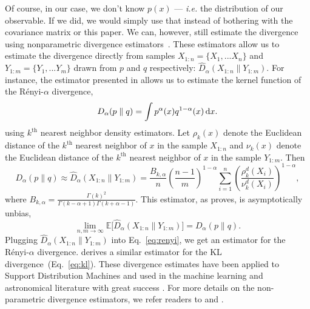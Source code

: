 \documentclass[12pt, letterpaper, preprint]{aastex}
\newcommand{\beq}{\begin{equation}}
\newcommand{\eeq}{\end{equation}}
\begin{document}
Of course, in our case, we don't know $p(x)$ --- \emph{i.e.} the distribution of
our observable. If we did, we would simply use that instead of bothering with 
the covariance matrix or this paper. We can, however, still estimate the 
divergence using nonparametric divergence estimators~\citep{wang2009, poczos2012, krishnamurthy2014}. 
These estimators allow us to estimate the divergence directly from 
samples $X_{1:n} = \{ X_1, ... X_n \}$ and $Y_{1:m} = \{ Y_1, ... Y_m \}$ 
drawn from $p$ and $q$ respectively: $\hat{D}_{\alpha}(X_{1:n} \parallel Y_{1:m})$. 
For instance, the estimator presented in \cite{poczos2012} allows us to estimate 
the kernel function of the R\'enyi-$\alpha$ divergence,
\beq \label{eq:d_alpha}
D_{\alpha} ( p \parallel q ) = \int p^\alpha(x) q^{1-\alpha}(x)\,{\rm d}x. 
\eeq
using $k^\mathrm{th}$ nearest neighbor density estimators. Let $\rho_k(x)$ 
denote the Euclidean distance of the $k^\mathrm{th}$ nearest neighbor 
of $x$ in the sample $X_{1:n}$ and $\nu_k(x)$ denote the Euclidean distance 
of the $k^\mathrm{th}$ nearest neighbor of $x$ in the sample $Y_{1:m}$. Then 
\beq \label{eq:d_alpha_est}
D_{\alpha}(p \parallel q) \approx \hat{D}_{\alpha}(X_{1:n} \parallel Y_{1:m}) = \frac{B_{k,\alpha}}{n} \left(\frac{n-1}{m}\right)^{1-\alpha}
\sum\limits_{i=1}^{n} \left(\frac{\rho_k^{d}(X_i)}{\nu_k^{d}(X_i)} \right)^{1-\alpha},
\eeq
where $B_{k, \alpha} = \frac{\Gamma(k)^2}{\Gamma(k-\alpha+1)\Gamma(k+\alpha-1)}$. 
This estimator, as \cite{poczos2012} proves, is asymptotically unbias,
\beq
\lim_{n, m \rightarrow \infty} \mathbb{E} \big[ \hat{D}_{\alpha} (X_{1:n} \parallel Y_{1:m}) \big] = D_{\alpha} (p \parallel q).
\eeq
Plugging $\hat{D}_{\alpha}(X_{1:n} \parallel Y_{1:m})$ into Eq.~\ref{eq:renyi},
we get an estimator for the R\'enyi-$\alpha$ divergence. \cite{wang2009} derives
a similar estimator for the KL divergence~(Eq.~\ref{eq:kl}). 
These divergence estimates have been applied to Support Distribution Machines 
and used in the machine learning and astronomical literature with great success
\citep[\emph{e.g.}][]{poczos2011, poczos2012, poczos2012a, poczos2012b, xu2013, ntampaka2015, ntampaka2016, ravanbakhsh2017a}.
For more details on the non-parametric divergence estimators, we refer readers to 
\cite{poczos2012} and \cite{krishnamurthy2014}.
\end{document}
